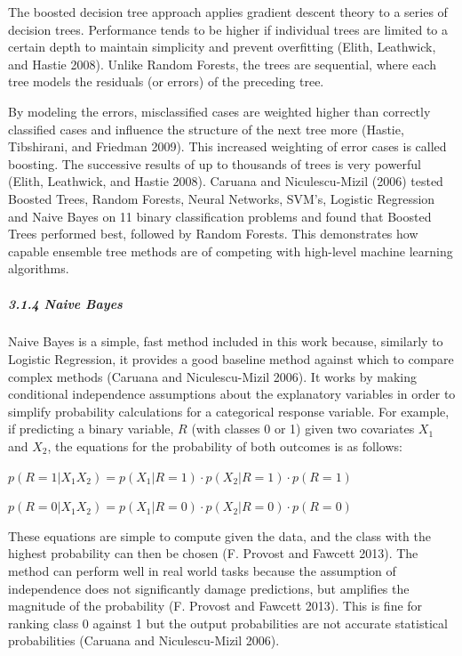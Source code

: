 \documentclass[]{elsarticle} %
\begin{document}
The boosted decision tree approach applies gradient descent theory to a
series of decision trees. Performance tends to be higher if individual
trees are limited to a certain depth to maintain simplicity and prevent
overfitting (Elith, Leathwick, and Hastie 2008). Unlike Random Forests,
the trees are sequential, where each tree models the residuals (or
errors) of the preceding tree.

By modeling the errors, misclassified cases are weighted higher than
correctly classified cases and influence the structure of the next tree
more (Hastie, Tibshirani, and Friedman 2009). This increased weighting
of error cases is called boosting. The successive results of up to
thousands of trees is very powerful (Elith, Leathwick, and Hastie 2008).
Caruana and Niculescu-Mizil (2006) tested Boosted Trees, Random Forests,
Neural Networks, SVM's, Logistic Regression and Naive Bayes on 11 binary
classification problems and found that Boosted Trees performed best,
followed by Random Forests. This demonstrates how capable ensemble tree
methods are of competing with high-level machine learning algorithms.

\subparagraph{3.1.4 Naive Bayes}\label{naive-bayes}

Naive Bayes is a simple, fast method included in this work because,
similarly to Logistic Regression, it provides a good baseline method
against which to compare complex methods (Caruana and Niculescu-Mizil
2006). It works by making conditional independence assumptions about the
explanatory variables in order to simplify probability calculations for
a categorical response variable. For example, if predicting a binary
variable, \(R\) (with classes 0 or 1) given two covariates \(X_1\) and
\(X_2\), the equations for the probability of both outcomes is as
follows:

\(p(R = 1|X_1 X_2) = p(X_1|R = 1) \cdot p(X_2|R = 1) \cdot p(R = 1)\)

\(p(R = 0|X_1 X_2) = p(X_1|R = 0) \cdot p(X_2|R = 0) \cdot p(R = 0)\)

These equations are simple to compute given the data, and the class with
the highest probability can then be chosen (F. Provost and Fawcett
2013). The method can perform well in real world tasks because the
assumption of independence does not significantly damage predictions,
but amplifies the magnitude of the probability (F. Provost and Fawcett
2013). This is fine for ranking class 0 against 1 but the output
probabilities are not accurate statistical probabilities (Caruana and
Niculescu-Mizil 2006).
\end{document}
